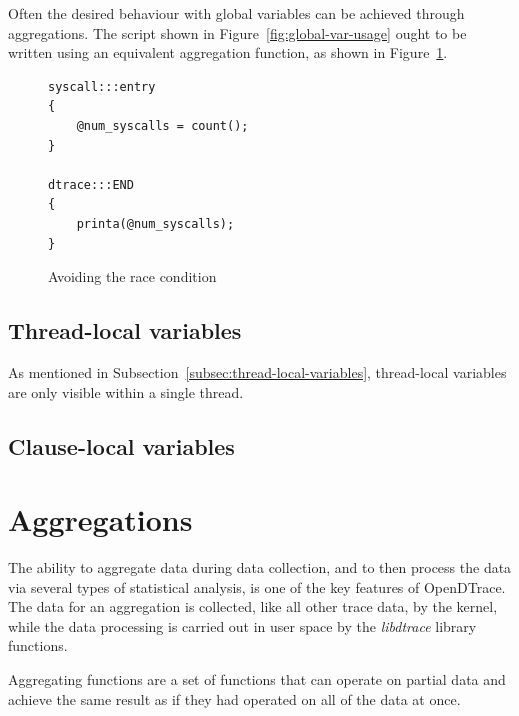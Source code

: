 \noindent
Often the desired behaviour with global variables can be achieved through
aggregations. The script shown in Figure~\ref{fig:global-var-usage} ought to be
written using an equivalent aggregation function, as shown in
Figure~\ref{fig:avoiding-the-race}.

\begin{figure}
  \begin{lstlisting}
syscall:::entry
{
    @num_syscalls = count();
}

dtrace:::END
{
    printa(@num_syscalls);
}
  \end{lstlisting}
  \caption{Avoiding the race condition}
  \label{fig:avoiding-the-race}
\end{figure}

\subsection{Thread-local variables}

As mentioned in Subsection~\ref{subsec:thread-local-variables}, thread-local
variables are only visible within a single thread.

\subsection{Clause-local variables}

\section{Aggregations}
\label{sec:aggregations}

The ability to aggregate data during data collection, and to then
process the data via several types of statistical analysis, is one of
the key features of OpenDTrace.  The data for an aggregation is
collected, like all other trace data, by the kernel, while the data
processing is carried out in user space by the \emph{libdtrace}
library functions.

Aggregating functions are a set of functions that can operate on
partial data and achieve the same result as if they had operated
on all of the data at once.

